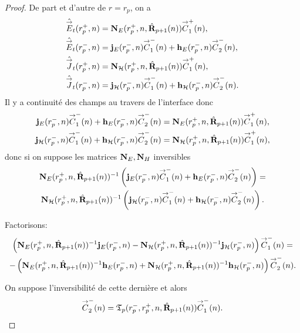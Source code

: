     \begin{proof}
      De part et d'autre de \(r=r_p\), on a 
      \begin{align*}
        \hat{{\overset{\rightarrow}{E}}}_t(r_p^+,n) &= \mathbf{N}_{E}(r_p^+,n,\hat{\mathbf{R}}_{p+1}(n)){\overset{\rightarrow}{C}}_{1}^+(n),
        \\
        \hat{{\overset{\rightarrow}{E}}}_t(r_p^-,n) &= \mathbf{j}_E(r_p^-,n){\overset{\rightarrow}{C}}_{1}^-(n) + \mathbf{h}_E(r_p^-,n){\overset{\rightarrow}{C}}_{2}^-(n),
        \\
        \hat{{\overset{\rightarrow}{J}}}_t(r_p^+,n) &= \mathbf{N}_{\mathcal{H}}(r_p^+,n,\hat{\mathbf{R}}_{p+1}(n)){\overset{\rightarrow}{C}}_{1}^+(n),
        \\
        \hat{{\overset{\rightarrow}{J}}}_t(r_p^-,n) &= \mathbf{j}_{\mathcal{H}}(r_p^-,n){\overset{\rightarrow}{C}}_{1}^-(n) + \mathbf{h}_{\mathcal{H}}(r_p^-,n){\overset{\rightarrow}{C}}_{2}^-(n).
      \end{align*}
      Il y a continuité des champs au travers de l'interface donc
      \begin{align*}
        \mathbf{j}_E(r_p^-,n){\overset{\rightarrow}{C}}_{1}^-(n) + \mathbf{h}_E(r_p^-,n){\overset{\rightarrow}{C}}_{2}^-(n) &= \mathbf{N}_{E}(r_p^+,n,\hat{\mathbf{R}}_{p+1}(n)){\overset{\rightarrow}{C}}_{1}^+(n),
        \\
        \mathbf{j}_{\mathcal{H}}(r_p^-,n){\overset{\rightarrow}{C}}_{1}^-(n) + \mathbf{h}_{\mathcal{H}}(r_p^-,n){\overset{\rightarrow}{C}}_{2}^-(n) &= \mathbf{N}_{\mathcal{H}}(r_p^+,n,\hat{\mathbf{R}}_{p+1}(n)){\overset{\rightarrow}{C}}_{1}^+(n),
      \end{align*}
      donc si on suppose les matrices \(\mathbf{N}_E, \mathbf{N}_H\) inversibles
      \begin{multline*}
        \mathbf{N}_{E}(r_p^+,n,\hat{\mathbf{R}}_{p+1}(n))^{-1}\left(\mathbf{j}_E(r_p^-,n){\overset{\rightarrow}{C}}_{1}^-(n) + \mathbf{h}_E(r_p^-,n){\overset{\rightarrow}{C}}_{2}^-(n)\right) =
        \\
        \mathbf{N}_{\mathcal{H}}(r_p^+,n,\hat{\mathbf{R}}_{p+1}(n))^{-1}\left(\mathbf{j}_{\mathcal{H}}(r_p^-,n){\overset{\rightarrow}{C}}_{1}^-(n) + \mathbf{h}_{\mathcal{H}}(r_p^-,n){\overset{\rightarrow}{C}}_{2}^-(n)\right).
      \end{multline*}

      Factorisons:
      \begin{multline*}
        \left(\mathbf{N}_{E}(r_p^+,n,\hat{\mathbf{R}}_{p+1}(n))^{-1}\mathbf{j}_E(r_p^-,n) - \mathbf{N}_{\mathcal{H}}(r_p^+,n,\hat{\mathbf{R}}_{p+1}(n))^{-1}\mathbf{j}_{\mathcal{H}}(r_p^-,n)\right){\overset{\rightarrow}{C}}_{1}^-(n) =
        \\
        -\left(\mathbf{N}_{E}(r_p^+,n,\hat{\mathbf{R}}_{p+1}(n))^{-1}\mathbf{h}_E(r_p^-,n) + \mathbf{N}_{\mathcal{H}}(r_p^+,n,\hat{\mathbf{R}}_{p+1}(n))^{-1}\mathbf{h}_{\mathcal{H}}(r_p^-,n)\right){\overset{\rightarrow}{C}}_{2}^-(n).
      \end{multline*}

      On suppose l'inversibilité de cette dernière et alors
      \begin{equation*}
        {\overset{\rightarrow}{C}}_{2}^-(n) = \mathfrak{T}_p(r_p^-,r_p^+,n,\hat{\mathbf{R}}_{p+1}(n)) {\overset{\rightarrow}{C}}_{1}^-(n).
      \end{equation*}
    \end{proof}

